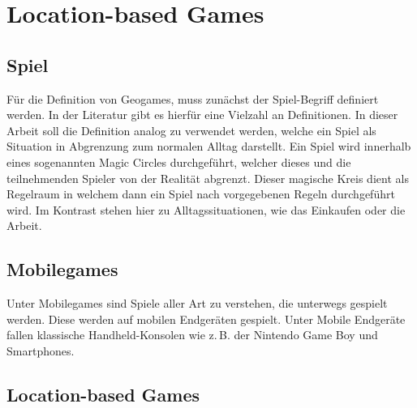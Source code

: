 \section{Location-based Games}
\label{ch3:s:Geogames}

\subsection*{Spiel}

Für die Definition von Geogames, muss zunächst der Spiel-Begriff definiert werden. In der Literatur gibt es hierfür eine Vielzahl an Definitionen.
In dieser Arbeit soll die Definition analog zu \textcite{Salen.2010} verwendet werden, welche ein Spiel als Situation in Abgrenzung zum normalen Alltag darstellt. Ein Spiel wird innerhalb eines sogenannten Magic Circles durchgeführt, welcher dieses und die teilnehmenden Spieler von der Realität abgrenzt.
Dieser magische Kreis dient als Regelraum in welchem dann ein Spiel nach vorgegebenen Regeln durchgeführt wird. Im Kontrast stehen hier zu Alltagssituationen, wie das Einkaufen oder die Arbeit.


\subsection*{Mobilegames}

Unter Mobilegames sind Spiele aller Art zu verstehen, die unterwegs gespielt werden. Diese werden auf mobilen Endgeräten gespielt.\cite{Bell.2006} Unter Mobile Endgeräte fallen klassische Handheld-Konsolen wie z.\,B. der Nintendo Game Boy und Smartphones.

\subsection*{Location-based Games}

